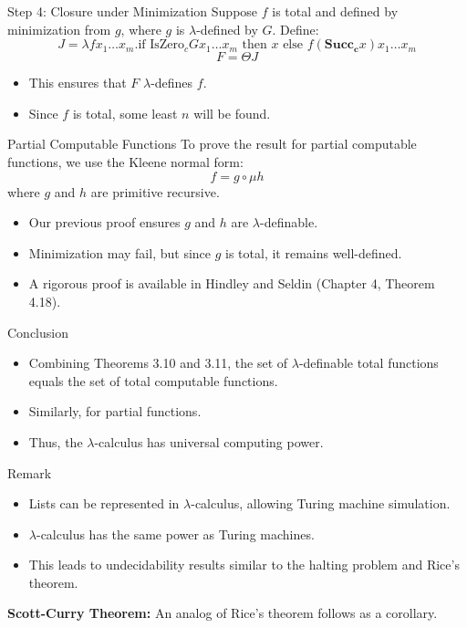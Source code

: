 \documentclass{beamer}
\begin{document}
\begin{frame}{Step 4: Closure under Minimization}
  Suppose $f$ is total and defined by minimization from $g$, where $g$ is $\lambda$-defined by $G$. Define:
  \[
  J = \lambda f x_1 \dots x_m. \text{if } \text{IsZero}_c G x_1 \dots x_m \text{ then } x \text{ else } f(\mathbf{Succ_c} x) x_1 \dots x_m
  \]
  \[
  F = \Theta J
  \]
  \begin{itemize}
      \item This ensures that $F$ $\lambda$-defines $f$.
      \item Since $f$ is total, some least $n$ will be found.
  \end{itemize}
\end{frame}

\begin{frame}{Partial Computable Functions}
  To prove the result for partial computable functions, we use the Kleene normal form:
  \[
  f = g \circ \mu h
  \]
  where $g$ and $h$ are primitive recursive.
  \begin{itemize}
      \item Our previous proof ensures $g$ and $h$ are $\lambda$-definable.
      \item Minimization may fail, but since $g$ is total, it remains well-defined.
      \item A rigorous proof is available in Hindley and Seldin (Chapter 4, Theorem 4.18).
  \end{itemize}
\end{frame}

\begin{frame}{Conclusion}
  \begin{itemize}
      \item Combining Theorems 3.10 and 3.11, the set of $\lambda$-definable total functions equals the set of total computable functions.
      \item Similarly, for partial functions.
      \item Thus, the $\lambda$-calculus has universal computing power.
  \end{itemize}
\end{frame}

\begin{frame}{Remark}
  \begin{itemize}
      \item Lists can be represented in $\lambda$-calculus, allowing Turing machine simulation.
      \item $\lambda$-calculus has the same power as Turing machines.
      \item This leads to undecidability results similar to the halting problem and Rice’s theorem.
  \end{itemize}
  \textbf{Scott-Curry Theorem:} An analog of Rice’s theorem follows as a corollary.
\end{frame}
\end{document}
